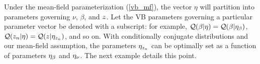 
Under the mean-field parameterization (\eqref{vb_mf}),
the vector $\eta$ will partition into parameters
governing $\nu$, $\beta$, and $z$. Let the VB parameters governing a
particular parameter vector be denoted with a subscript: for example,
$\mathcal{Q}(\beta \vert \eta) = \mathcal{Q}(\beta \vert \eta_{\beta})$,
$\mathcal{Q}(z_n \vert \eta) = \mathcal{Q}(z \vert \eta_{z_{n}})$, and so on.
With conditionally conjugate distributions and our mean-field assumption,
the parameters $\eta_{z_{n}}$ can be optimally set as a function of
parameters $\eta_{\beta}$ and $\eta_{\nu}$.
The next example details this point.


